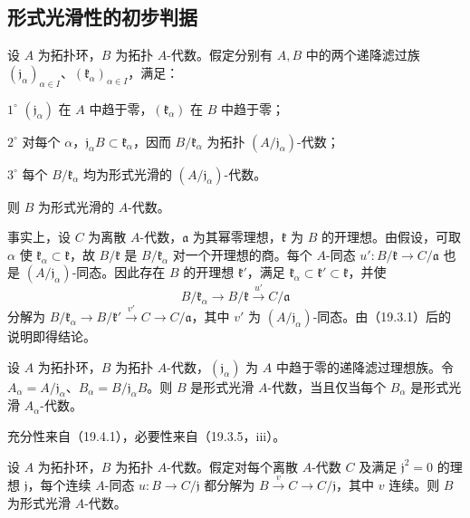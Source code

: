 \subsection{形式光滑性的初步判据}
设 $A$ 为拓扑环，$B$ 为拓扑 $A$-代数。假定分别有 $A,B$ 中的两个递降滤过族 $(\mathfrak j_\alpha)_{\alpha\in I}$、$(\mathfrak k_\alpha)_{\alpha\in I}$，满足：

$1^\circ$ $(\mathfrak j_\alpha)$ 在 $A$ 中趋于零，$(\mathfrak k_\alpha)$ 在 $B$ 中趋于零；

$2^\circ$ 对每个 $\alpha$，$\mathfrak j_\alpha B\subset\mathfrak k_\alpha$，因而 $B/\mathfrak k_\alpha$ 为拓扑 $(A/\mathfrak j_\alpha)$-代数；

$3^\circ$ 每个 $B/\mathfrak k_\alpha$ 均为形式光滑的 $(A/\mathfrak j_\alpha)$-代数。

则 $B$ 为形式光滑的 $A$-代数。

事实上，设 $C$ 为离散 $A$-代数，$\mathfrak a$ 为其幂零理想，$\mathfrak k$ 为 $B$ 的开理想。由假设，可取 $\alpha$ 使 $\mathfrak k_\alpha\subset\mathfrak k$，故 $B/\mathfrak k$ 是 $B/\mathfrak k_\alpha$ 对一个开理想的商。每个 $A$-同态 $u':B/\mathfrak k\to C/\mathfrak a$ 也是 $(A/\mathfrak j_\alpha)$-同态。因此存在 $B$ 的开理想 $\mathfrak k'$，满足 $\mathfrak k_\alpha\subset\mathfrak k'\subset\mathfrak k$，并使
\[
 B/\mathfrak k_\alpha\to B/\mathfrak k\xrightarrow{u'}C/\mathfrak a
\]
分解为 $B/\mathfrak k_\alpha\to B/\mathfrak k'\xrightarrow{v'}C\to C/\mathfrak a$，其中 $v'$ 为 $(A/\mathfrak j_\alpha)$-同态。由（19.3.1）后的说明即得结论。

设 $A$ 为拓扑环，$B$ 为拓扑 $A$-代数，$(\mathfrak j_\alpha)$ 为 $A$ 中趋于零的递降滤过理想族。令 $A_\alpha=A/\mathfrak j_\alpha$、$B_\alpha=B/\mathfrak j_\alpha B$。则 $B$ 是形式光滑 $A$-代数，当且仅当每个 $B_\alpha$ 是形式光滑 $A_\alpha$-代数。

充分性来自（19.4.1），必要性来自（19.3.5，iii）。

设 $A$ 为拓扑环，$B$ 为拓扑 $A$-代数。假定对每个离散 $A$-代数 $C$ 及满足 $\mathfrak j^2=0$ 的理想 $\mathfrak j$，每个连续 $A$-同态 $u:B\to C/\mathfrak j$ 都分解为 $B\xrightarrow{v}C\to C/\mathfrak j$，其中 $v$ 连续。则 $B$ 为形式光滑 $A$-代数。


